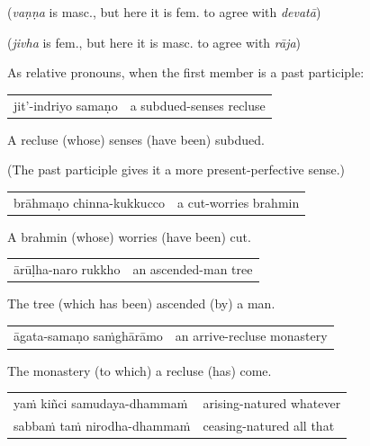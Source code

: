 \documentclass[11pt,oneside]{memoir}
\begin{document}
(\emph{vaṇṇa} is masc., but here it is fem. to agree with \emph{devatā})

(\emph{jivha} is fem., but here it is masc. to agree with \emph{rāja})

As relative pronouns, when the first member is a past participle:

\begin{center}
\begin{tabular}{ll}
jit'-indriyo samaṇo & a subdued-senses recluse\\
\end{tabular}
\end{center}

A recluse (whose) senses (have been) subdued.

(The past participle gives it a more present-perfective sense.)

\begin{center}
\begin{tabular}{ll}
brāhmaṇo chinna-kukkucco & a cut-worries brahmin\\
\end{tabular}
\end{center}

A brahmin (whose) worries (have been) cut.

\begin{center}
\begin{tabular}{ll}
ārūḷha-naro rukkho & an ascended-man tree\\
\end{tabular}
\end{center}

The tree (which has been) ascended (by) a man.

\begin{center}
\begin{tabular}{ll}
āgata-samaṇo saṁghārāmo & an arrive-recluse monastery\\
\end{tabular}
\end{center}

The monastery (to which) a recluse (has) come.

\begin{center}
\begin{tabular}{ll}
yaṁ kiñci samudaya-dhammaṁ & arising-natured whatever\\
sabbaṁ taṁ nirodha-dhammaṁ & ceasing-natured all that\\
\end{tabular}
\end{center}
\end{document}
